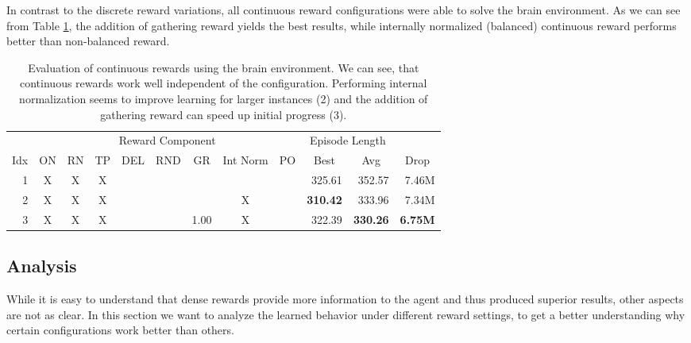 In contrast to the discrete reward variations, all continuous reward configurations were able to solve the brain environment. As we can see from Table \ref{tab:Maze0122/Reward/Continuous}, the addition of gathering reward yields the best results, while internally normalized (balanced) continuous reward performs better than non-balanced reward.

\begin{table}[htp]
    \begin{center}
        \begin{tabular}{rccccccccrrr}
            \toprule
             & \multicolumn{8}{c}{Reward Component} & \multicolumn{2}{c}{Episode Length} & \\
            \cmidrule(lr){2-9}\cmidrule(lr){10-11}
            \multicolumn{1}{c}{Idx} & \multicolumn{1}{c}{ON} & \multicolumn{1}{c}{RN} & \multicolumn{1}{c}{TP} & \multicolumn{1}{c}{DEL} & \multicolumn{1}{c}{RND} & \multicolumn{1}{c}{GR} & \multicolumn{1}{c}{Int Norm} & \multicolumn{1}{c}{PO} & \multicolumn{1}{c}{Best} & \multicolumn{1}{c}{Avg} & \multicolumn{1}{c}{Drop}\\
            \midrule
            1 & X & X & X &  &  &  &  &  & 325.61 & 352.57 & 7.46M \\
            2 & X & X & X &  &  &  & X &  & \textbf{310.42} & 333.96 & 7.34M \\
            3 & X & X & X &  &  & 1.00 & X &  & 322.39 & \textbf{330.26} & \textbf{6.75M} \\
            \bottomrule
        \end{tabular}
    \end{center}
    \caption[Evaluation of Continuous Reward using the Brain Environment]{Evaluation of continuous rewards using the brain environment. We can see, that continuous rewards work well independent of the configuration. Performing internal normalization seems to improve learning for larger instances (2) and the addition of gathering reward can speed up initial progress (3).} \label{tab:Maze0122/Reward/Continuous}
\end{table}


\subsection{Analysis} \label{sec:RewardAnalysis}
While it is easy to understand that dense rewards provide more information to the agent and thus produced superior results, other aspects are not as clear. In this section we want to analyze the learned behavior under different reward settings, to get a better understanding why certain configurations work better than others.

